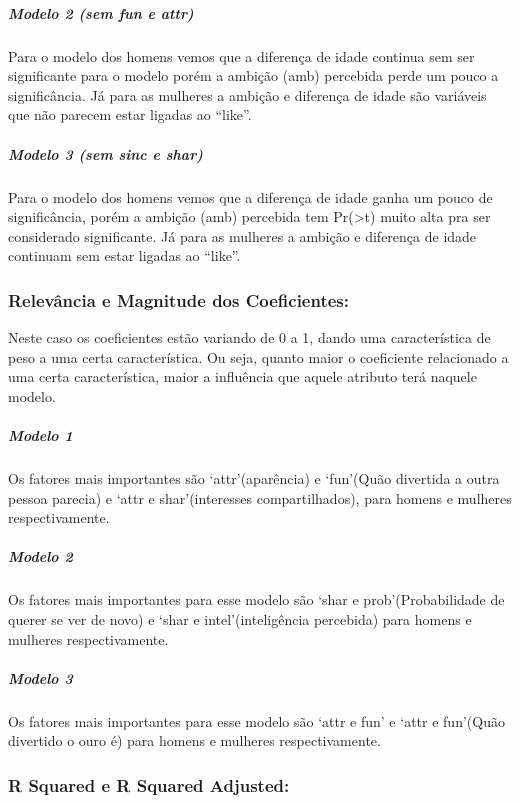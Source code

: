 \documentclass[]{article}
\let\oldsubparagraph\subparagraph
\renewcommand{\subparagraph}[1]{\oldsubparagraph{#1}\mbox{}}
\begin{document}
\hypertarget{modelo-2-sem-fun-e-attr}{%
\subparagraph{Modelo 2 (sem fun e attr)}\label{modelo-2-sem-fun-e-attr}}

Para o modelo dos homens vemos que a diferença de idade continua sem ser
significante para o modelo porém a ambição (amb) percebida perde um
pouco a significância. Já para as mulheres a ambição e diferença de
idade são variáveis que não parecem estar ligadas ao ``like''.

\hypertarget{modelo-3-sem-sinc-e-shar}{%
\subparagraph{Modelo 3 (sem sinc e
shar)}\label{modelo-3-sem-sinc-e-shar}}

Para o modelo dos homens vemos que a diferença de idade ganha um pouco
de significância, porém a ambição (amb) percebida tem
Pr(\textgreater{}\textbar{}t\textbar{}) muito alta pra ser considerado
significante. Já para as mulheres a ambição e diferença de idade
continuam sem estar ligadas ao ``like''.

\hypertarget{relevuxe2ncia-e-magnitude-dos-coeficientes}{%
\subsubsection{Relevância e Magnitude dos
Coeficientes:}\label{relevuxe2ncia-e-magnitude-dos-coeficientes}}

Neste caso os coeficientes estão variando de 0 a 1, dando uma
característica de peso a uma certa característica. Ou seja, quanto maior
o coeficiente relacionado a uma certa característica, maior a influência
que aquele atributo terá naquele modelo.

\hypertarget{modelo-1-1}{%
\subparagraph{Modelo 1}\label{modelo-1-1}}

Os fatores mais importantes são `attr'(aparência) e `fun'(Quão divertida
a outra pessoa parecia) e `attr e shar'(interesses compartilhados), para
homens e mulheres respectivamente.

\hypertarget{modelo-2}{%
\subparagraph{Modelo 2}\label{modelo-2}}

Os fatores mais importantes para esse modelo são `shar e
prob'(Probabilidade de querer se ver de novo) e `shar e
intel'(inteligência percebida) para homens e mulheres respectivamente.

\hypertarget{modelo-3}{%
\subparagraph{Modelo 3}\label{modelo-3}}

Os fatores mais importantes para esse modelo são `attr e fun' e `attr e
fun'(Quão divertido o ouro é) para homens e mulheres respectivamente.

\hypertarget{r-squared-e-r-squared-adjusted}{%
\subsubsection{R Squared e R Squared
Adjusted:}\label{r-squared-e-r-squared-adjusted}}
\end{document}
